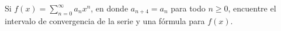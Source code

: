 \item Si $f(x) = \displaystyle\sum_{n=0}^\infty a_n x^n$, en donde $a_{n+4} = a_n$ para todo $n \ge 0$, encuentre el intervalo de convergencia de la serie y una fórmula para $f(x)$.
